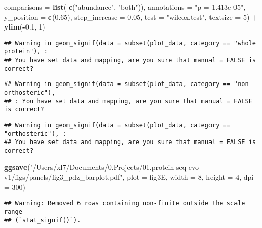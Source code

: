 \documentclass[
]{article}
\newenvironment{Shaded}{\begin{snugshade}}{\end{snugshade}}
\newcommand{\AttributeTok}[1]{\textcolor[rgb]{0.13,0.29,0.53}{#1}}
\newcommand{\DecValTok}[1]{\textcolor[rgb]{0.00,0.00,0.81}{#1}}
\newcommand{\FloatTok}[1]{\textcolor[rgb]{0.00,0.00,0.81}{#1}}
\newcommand{\FunctionTok}[1]{\textcolor[rgb]{0.13,0.29,0.53}{\textbf{#1}}}
\newcommand{\NormalTok}[1]{#1}
\newcommand{\SpecialCharTok}[1]{\textcolor[rgb]{0.81,0.36,0.00}{\textbf{#1}}}
\newcommand{\StringTok}[1]{\textcolor[rgb]{0.31,0.60,0.02}{#1}}
\begin{document}
\begin{Shaded}
\begin{Highlighting}[]
              \AttributeTok{comparisons =} \FunctionTok{list}\NormalTok{( }\FunctionTok{c}\NormalTok{(}\StringTok{"abundance"}\NormalTok{, }\StringTok{"both"}\NormalTok{)),}
              \AttributeTok{annotations =} \StringTok{"p = 1.413e{-}05"}\NormalTok{,}
              \AttributeTok{y\_position =} \FunctionTok{c}\NormalTok{(}\FloatTok{0.65}\NormalTok{),}
              \AttributeTok{step\_increase =} \FloatTok{0.05}\NormalTok{,}
              \AttributeTok{test =} \StringTok{"wilcox.test"}\NormalTok{,}
              \AttributeTok{textsize =} \DecValTok{5}\NormalTok{) }\SpecialCharTok{+}
  \FunctionTok{ylim}\NormalTok{(}\SpecialCharTok{{-}}\FloatTok{0.1}\NormalTok{, }\DecValTok{1}\NormalTok{)}
\end{Highlighting}
\end{Shaded}

\begin{verbatim}
## Warning in geom_signif(data = subset(plot_data, category == "whole protein"), :
## You have set data and mapping, are you sure that manual = FALSE is correct?
\end{verbatim}

\begin{verbatim}
## Warning in geom_signif(data = subset(plot_data, category == "non-orthosteric"),
## : You have set data and mapping, are you sure that manual = FALSE is correct?
\end{verbatim}

\begin{verbatim}
## Warning in geom_signif(data = subset(plot_data, category == "orthosteric"), :
## You have set data and mapping, are you sure that manual = FALSE is correct?
\end{verbatim}

\begin{Shaded}
\begin{Highlighting}[]
\FunctionTok{ggsave}\NormalTok{(}\StringTok{"/Users/xl7/Documents/0.Projects/01.protein{-}seq{-}evo{-}v1/figs/panels/fig3\_pdz\_barplot.pdf"}\NormalTok{, }
       \AttributeTok{plot =}\NormalTok{ fig3E, }\AttributeTok{width =} \DecValTok{8}\NormalTok{, }\AttributeTok{height =} \DecValTok{4}\NormalTok{, }\AttributeTok{dpi =} \DecValTok{300}\NormalTok{)}
\end{Highlighting}
\end{Shaded}

\begin{verbatim}
## Warning: Removed 6 rows containing non-finite outside the scale range
## (`stat_signif()`).
\end{verbatim}
\end{document}
